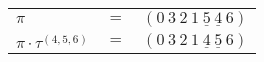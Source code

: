 \begin{example}\label{example:HGHICRCG}
  \hfill
  \begin{\position}
    \begin{tabular}{lll}
      $\pi$ & $=$ & $({0}~{3}~{2}~{1}~\underline{{5}}~\underline{{4}}~{6})$ \\
      $\pi \cdot \tau^{(4,5,6)}$ & $=$ & $({0}~{3}~{2}~{1}~\underline{{4}}~\underline{{5}}~{6})$ \\
    \end{tabular}
  \end{\position}
\end{example}